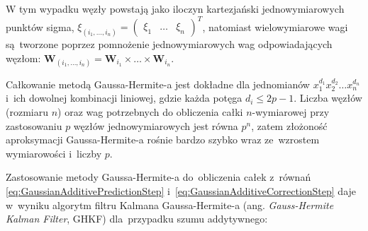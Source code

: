 W tym wypadku węzły powstają jako iloczyn kartezjański jednowymiarowych punktów sigma, $\xi_{(i_1, \dots, i_n)}=\begin{pmatrix}
\xi_1 & \dots & \xi_n
\end{pmatrix}^T$, natomiast wielowymiarowe wagi są~tworzone poprzez pomnożenie jednowymiarowych wag odpowiadających węzłom: $\boldsymbol{W}_{(i_1, \dots, i_n)} = \boldsymbol{W}_{i_1} \times \dots \times \boldsymbol{W}_{i_n}$.
\par
Całkowanie metodą Gaussa-Hermite-a jest dokładne dla jednomianów $x_{1}^{d_{1}} x_{2}^{d_{2}} \dots x_{n}^{d_{n}}$ i~ich dowolnej kombinacji liniowej, gdzie każda potęga $d_i \leq 2p-1$. Liczba węzłów (rozmiaru $n$) oraz wag potrzebnych do obliczenia całki $n$-wymiarowej przy zastosowaniu $p$ węzłów jednowymiarowych jest równa $p^n$, zatem złożoność aproksymacji Gaussa-Hermite-a rośnie bardzo szybko wraz ze~wzrostem wymiarowości i~liczby $p$. \cite[103]{Sarka}
\par
Zastosowanie metody Gaussa-Hermite-a do~obliczenia całek z~równań \ref{eq:GaussianAdditivePredictionStep} i~\ref{eq:GaussianAdditiveCorrectionStep} daje w~wyniku algorytm filtru Kalmana Gaussa-Hermite-a (ang. \textit{Gauss-Hermite Kalman Filter}, GHKF) dla~przypadku szumu addytywnego: \cite{Arasaratnam}
